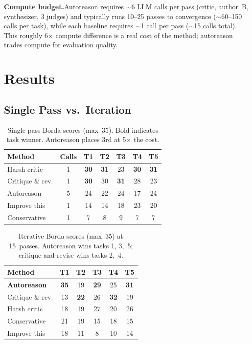 \documentclass[10pt,twocolumn]{article}
\begin{document}
\textbf{Compute budget.}\enspace Autoreason requires ${\sim}$6 LLM calls per pass (critic, author~B, synthesizer, 3 judges) and typically runs 10--25 passes to convergence (${\sim}$60--150 calls per task), while each baseline requires ${\sim}$1 call per pass (${\sim}$15 calls total). This roughly 6$\times$ compute difference is a real cost of the method; autoreason trades compute for evaluation quality.

\section{Results}

\subsection{Single Pass vs.\ Iteration}
\label{sec:v1}

\begin{table}[H]
\centering
\small
\begin{tabular}{@{}lcccccc@{}}
\toprule
\textbf{Method} & \textbf{Calls} & \textbf{T1} & \textbf{T2} & \textbf{T3} & \textbf{T4} & \textbf{T5} \\
\midrule
\rowcolor{TableShade}
Harsh critic & 1 & \textbf{30} & \textbf{31} & 23 & \textbf{30} & \textbf{31} \\
Critique \& rev. & 1 & \textbf{30} & 30 & \textbf{31} & 28 & 23 \\
\rowcolor{TableShade}
Autoreason & 5 & 24 & 22 & 24 & 17 & 24 \\
Improve this & 1 & 14 & 14 & 18 & 23 & 20 \\
\rowcolor{TableShade}
Conservative & 1 & 7 & 8 & 9 & 7 & 7 \\
\bottomrule
\end{tabular}
\caption{Single-pass Borda scores (max~35). Bold indicates task winner. Autoreason places 3rd at 5$\times$ the cost.}
\label{tab:v1}
\end{table}

\begin{table}[H]
\centering
\small
\begin{tabular}{@{}lccccc@{}}
\toprule
\textbf{Method} & \textbf{T1} & \textbf{T2} & \textbf{T3} & \textbf{T4} & \textbf{T5} \\
\midrule
\rowcolor{TableShade}
\textbf{Autoreason} & \textbf{35} & 19 & \textbf{29} & 25 & \textbf{31} \\
Critique \& rev. & 13 & \textbf{22} & 26 & \textbf{32} & 19 \\
\rowcolor{TableShade}
Harsh critic & 18 & 19 & 27 & 20 & 26 \\
Conservative & 21 & 19 & 15 & 18 & 15 \\
\rowcolor{TableShade}
Improve this & 18 & 11 & 8 & 10 & 14 \\
\bottomrule
\end{tabular}
\caption{Iterative Borda scores (max~35) at 15~passes. Autoreason wins tasks 1, 3,~5; critique-and-revise wins tasks 2,~4.}
\label{tab:multi}
\end{table}
\end{document}

